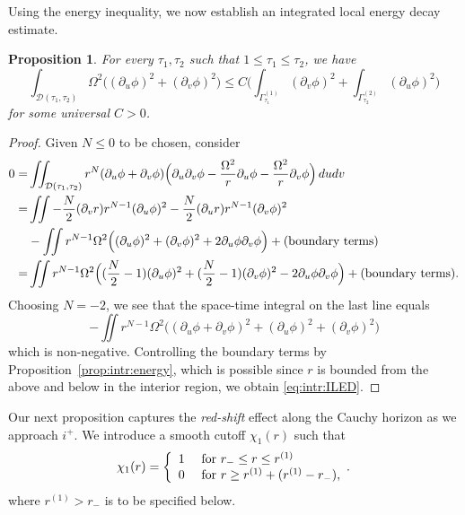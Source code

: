 \documentclass[12 pt, reqno]{amsart}
\newtheorem{proposition}[theorem]{Proposition}
\theoremstyle{definition}
\theoremstyle{remark}
\numberwithin{equation}{section}
\newcommand{\ud}{d}
\newcommand{\rd}{\partial}
\newcommand{\bb}{\Big}
\newcommand{\0}{\emptyset}
\newcommand{\Gmm}{\Gamma}
\newcommand{\Omg}{\Omega}
\newcommand{\calD}{\mathcal D}
\begin{document}
Using the energy inequality, we now establish an integrated local energy decay estimate.
\begin{proposition} \label{prop:intr:ILED}
For every $\tau_{1}, \tau_{2}$ such that $1 \leq \tau_{1} \leq \tau_{2}$, we have
\begin{equation} \label{eq:intr:ILED}
	\int_{\calD(\tau_{1}, \tau_{2})} \Omg^{2} \bb( (\rd_{u} \phi)^{2} + (\rd_{v} \phi)^{2} \bb)
	\leq C \bb( \int_{\Gmm^{(1)}_{\tau_{1}}} (\rd_{v} \phi)^{2} + \int_{\Gmm^{(2)}_{\tau_{2}}} (\rd_{u} \phi)^{2} \bb)
\end{equation}
for some universal $C>0$.
\end{proposition}
\begin{proof} 
Given $N \leq 0$ to be chosen, consider
\begin{align*}
	0 =& \iint_{\calD(\tau_{1}, \tau_{2})}	
			r^{N} (\rd_{u} \phi + \rd_{v} \phi) \bb( \rd_{u} \rd_{v} \phi - \frac{\Omg^{2}}{r} \rd_{u} \phi - \frac{\Omg^{2}}{r} \rd_{v} \phi \bb) \, \ud u \ud v \\
	=& \iint - \frac{N}{2} (\rd_{v} r) r^{N-1} (\rd_{u} \phi)^{2} - \frac{N}{2} (\rd_{u} r) r^{N-1} (\rd_{v} \phi)^{2}\\
		& - \iint r^{N-1} \Omg^{2} \bb( (\rd_{u} \phi)^{2} + (\rd_{v} \phi)^{2} + 2 \rd_{u} \phi \rd_{v} \phi \bb) + (\hbox{boundary terms})\\
	=& \iint r^{N-1} \Omg^{2} \bb( (\frac{N}{2} - 1 ) (\rd_{u} \phi)^{2} + ( \frac{N}{2} - 1 ) (\rd_{v} \phi)^{2} - 2 \rd_{u} \phi \rd_{v} \phi \bb)
		+ (\hbox{boundary terms}).
\end{align*}
Choosing $N = -2$, we see that the space-time integral on the last line equals
\begin{equation*}
	- \iint r^{N-1} \Omg^{2} \bb( (\rd_{u} \phi + \rd_{v} \phi)^{2} + (\rd_{u} \phi)^{2} + (\rd_{v} \phi)^{2} \bb)
\end{equation*}
which is non-negative. Controlling the boundary terms by Proposition~\ref{prop:intr:energy}, which is possible since $r$ is bounded from the above and below in the interior region, we obtain \eqref{eq:intr:ILED}.
\end{proof}

Our next proposition captures the \emph{red-shift} effect along the Cauchy horizon as we approach $i^{+}$. We introduce a smooth cutoff $\chi_{1}(r)$ such that
\begin{equation}\label{chi1.def}
	\chi_{1}(r) = 
	\left\{
\begin{array}{cl}	
	1 & \hbox{ for } r_{-} \leq r \leq r^{(1)} \\
	0 & \hbox{ for } r \geq r^{(1)} + (r^{(1)} - r_{-}),
\end{array}. \right.
\end{equation}
where $r^{(1)} > r_{-}$ is to be specified below.
\end{document}
